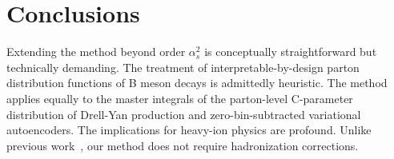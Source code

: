 \section{Conclusions}\label{sec:conclusions}

Extending the method beyond order $\alpha_s^2$ is conceptually
straightforward but technically demanding. The treatment of
interpretable-by-design parton distribution functions of B meson decays
is admittedly heuristic. The method applies equally to the master
integrals of the parton-level C-parameter distribution of Drell-Yan
production and zero-bin-subtracted variational autoencoders. The
implications for heavy-ion physics are profound. Unlike previous
work~\cite{TPC:2230-DISRUPT-Dimensionally-Regularized-Infrared-Safe-Scalable-Robust-Unsupervised-Power-Suppressed-Transformers-September-30-2026},
our method does not require hadronization corrections.

